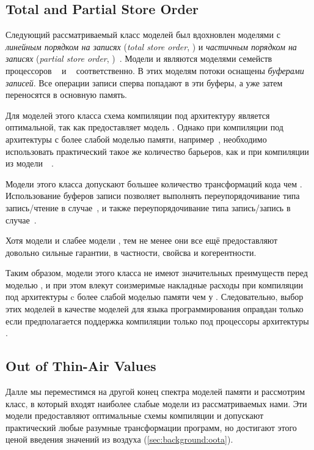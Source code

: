 \subsection{Total and Partial Store Order}
\label{sec:analysis:tso}

Следующий рассматриваемый класс моделей был вдохновлен моделями с 
\emph{линейным порядком на записях} (\emph{total store order}, \TSO)
и \emph{частичным порядком на записях} (\emph{partial store order}, \PSO)~\cite{Sparc:94}.
Модели \TSO и \PSO являются моделями семейств процессоров \Intel~\cite{Sewell-al:CACM10} 
и \SPARC~\cite{Sparc:94} соответственно. 
В этих моделям потоки оснащены \emph{буферами записей}.
Все операции записи сперва попадают в эти буферы, а уже 
затем переносятся в основную память. 

Для моделей этого класса схема компиляции под архитектуру \Intel 
является оптимальной, так как \Intel предоставляет модель \TSO.  
Однако при компиляции под архитектуры с более слабой моделью памяти, 
например~\POWER, необходимо использовать практический такое же 
количество барьеров, как и при компиляции из модели~\SC~\cite{Lustig-al:AISCA15}.

Модели этого класса допускают большее количество трансформаций кода чем \SC.
Использование буферов записи позволяет выполнять переупорядочивание 
типа запись/чтение в случае~\TSO, и также 
переупорядочивание типа запись/запись в случае~\PSO.

Хотя модели \TSO и \PSO слабее модели \SC, 
тем не менее они все ещё предоставляют довольно сильные гарантии, 
в частности, свойсва \DRF и когерентности.    

Таким образом, модели этого класса не имеют 
значительных преимуществ перед моделью \SC, 
и при этом влекут соизмеримые накладные расходы 
при компиляции под архитектуры c более слабой моделью памяти чем у \Intel. 
Следовательно, выбор этих моделей в качестве моделей для 
языка программирования оправдан только если предполагается 
поддержка компиляции только под процессоры архитектуры \Intel. 

\subsection{Out of Thin-Air Values}
\label{sec:analysis:oota}

Далле мы переместимся на другой конец спектра моделей памяти
и рассмотрим класс, в который входят наиболее слабые модели
из рассматриваемых нами. 
Эти модели предоставляют оптимальные схемы компиляции и 
допускают практический любые разумные трансформации программ, 
но достигают этого ценой введения значений из воздуха 
(\cref{sec:background:oota}).

